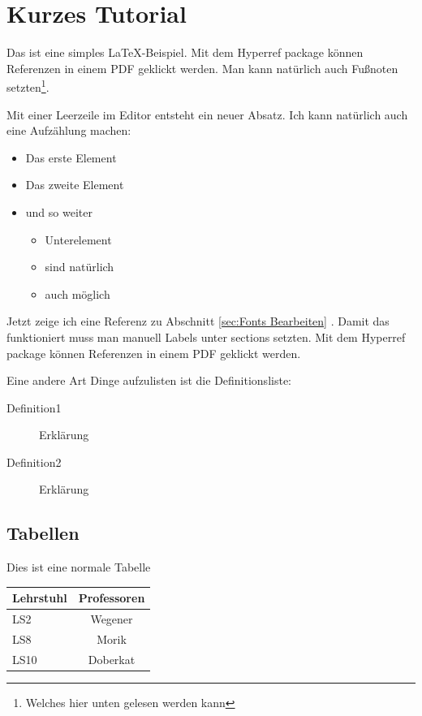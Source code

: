 %
%
%	

\section{Kurzes Tutorial}
Das ist eine simples \LaTeX-Beispiel. Mit dem Hyperref package können Referenzen in einem PDF geklickt werden. Man kann natürlich auch Fußnoten setzten\footnote{Welches hier unten gelesen werden kann}.

Mit einer Leerzeile im Editor entsteht ein neuer Absatz. Ich kann natürlich auch eine Aufzählung machen:
\begin{itemize}
  \item Das erste Element
  \item Das zweite Element
  \item und so weiter
  \begin{itemize}
	  \item Unterelement
	  \item sind natürlich
	  \item auch möglich
	\end{itemize}
\end{itemize}


Jetzt zeige ich eine Referenz zu Abschnitt \ref{sec:Fonts Bearbeiten} . Damit das funktioniert muss man manuell Labels unter sections setzten. Mit dem Hyperref package können Referenzen in einem PDF geklickt werden.

Eine andere Art Dinge aufzulisten ist die Definitionsliste:
\begin{description}
	\item[Definition1] Erklärung
	\item[Definition2] Erklärung
\end{description}
\subsection{Tabellen}
Dies ist eine normale Tabelle
\begin{tabular}[h]{|l|c|} %
  \hline
  Lehrstuhl & Professoren\\
  \hline\hline
  LS2 & Wegener\\
  LS8 & Morik\\
  LS10 & Doberkat\\
  \hline
\end{tabular}

